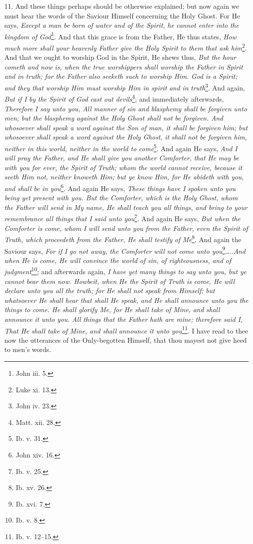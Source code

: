 11. And these things perhaps should be otherwise explained; but now again we must hear the words of the Saviour Himself concerning the Holy Ghost. For He says, \emph{Except a man be born of water and of the Spirit, he cannot enter into the kingdom of God}\footnote{John iii. 5.}. And that this grace is from the Father, He thus states, \emph{How much more shall your heavenly Father give the Holy Spirit to them that ask him}\footnote{Luke xi. 13.}. And that we ought to worship God in the Spirit, He shews thus, \emph{But the hour cometh and now is, when the true worshippers shall worship the Father in Spirit and in truth; for the Father also seeketh such to worship Him. God is a Spirit; and they that worship Him must worship Him in spirit and in truth}\footnote{John iv. 23.}. And again, \emph{But if I by the} \emph{Spirit of God cast out devils}\footnote{Matt. xii. 28.}; and immediately afterwards, \emph{Therefore I say unto you, All manner of sin and blasphemy shall be forgiven unto men; but the blasphemy against the Holy Ghost shall not be forgiven. And whosoever shall speak a word against the Son of man, it shall be forgiven him; but whosoever shall speak a word against the Holy Ghost, it shall not be forgiven him, neither in this world, neither in the world to come}\footnote{Ib. v. 31.}. And again He says, \emph{And I will pray the Father, and He shall give you another Comforter, that He may be with you for ever, the Spirit of Truth; whom the world cannot receive, because it seeth Him not, neither knoweth Him; but ye know Him, for He abideth with you, and shall be in you}\footnote{John xiv. 16.}. And again He says, \emph{These things have I spoken unto you being yet present with you. But the Comforter, which is the Holy Ghost, whom the Father will send in My name, He shall teach you all things, and bring to your remembrance all things that I said unto you}\footnote{Ib. v. 25.}. And again He says, \emph{But when the Comforter is come, whom I will send unto you from the Father, even the Spirit of Truth, which proceedeth from the Father, He shall testify of Me}\footnote{Ib. xv. 26.}. And again the Saviour says, \emph{For if I go not away, the Comforter will not come unto you}\footnote{Ib. xvi. 7.}…..\emph{And when He is come, He will convince the world of sin, of righteousness, and of judgment}\footnote{Ib. v. 8.}; and afterwards again, \emph{I have yet many things to say unto you, but ye cannot bear them now. Howbeit, when He the Spirit of Truth is come, He will declare unto you all the truth; for He shall not speak from Himself; but whatsoever He shall hear that shall He speak, and He shall announce unto you the things to come. He shall glorify Me, for He shall take of Mine, and shall announce it unto you. All things that the Father hath are mine; therefore said I, That He shall take of Mine, and shall announce it unto you}\footnote{Ib. v. 12–15.}. I have read to thee now the utterances of the Only-begotten Himself, that thou mayest not give heed to men’s words.

